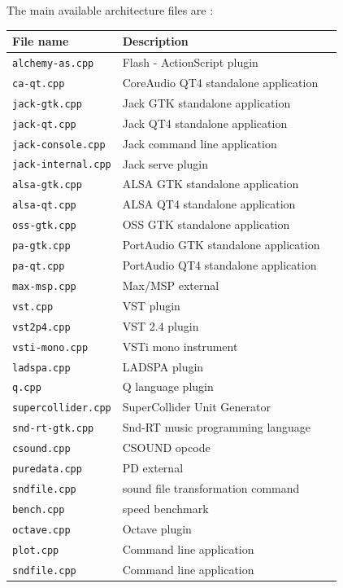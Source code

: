 \documentclass[a4paper,10pt]{book}
\begin{document}
\bigskip

The main available architecture files are :

\bigskip

\begin{tabular}{|l|l|l|}
\hline
\textbf{File name}			& \textbf{Description}   \\
\hline
\texttt{alchemy-as.cpp} 	& Flash - ActionScript plugin \\
\texttt{ca-qt.cpp} 			& CoreAudio QT4 standalone application  \\
\texttt{jack-gtk.cpp} 		& Jack GTK standalone application  \\
\texttt{jack-qt.cpp} 		& Jack QT4 standalone application  \\
\texttt{jack-console.cpp} 	& Jack command line application  \\
\texttt{jack-internal.cpp} 	& Jack serve plugin  \\
\texttt{alsa-gtk.cpp} 		& ALSA GTK standalone application  \\
\texttt{alsa-qt.cpp} 		& ALSA QT4 standalone application  \\
\texttt{oss-gtk.cpp} 		& OSS GTK standalone application  \\
\texttt{pa-gtk.cpp} 		& PortAudio GTK standalone application  \\
\texttt{pa-qt.cpp} 			& PortAudio QT4 standalone application  \\
\hline
\texttt{max-msp.cpp} 		& Max/MSP external  \\
\texttt{vst.cpp} 			& VST plugin  \\
\texttt{vst2p4.cpp} 		& VST 2.4 plugin  \\
\texttt{vsti-mono.cpp} 		& VSTi mono instrument  \\
\texttt{ladspa.cpp} 		& LADSPA plugin  \\
\texttt{q.cpp} 				& Q language plugin  \\
\texttt{supercollider.cpp} 	& SuperCollider Unit Generator  \\
\texttt{snd-rt-gtk.cpp} 	& Snd-RT music programming language  \\
\texttt{csound.cpp} 		& CSOUND opcode  \\
\texttt{puredata.cpp} 		& PD external  \\
\hline
\texttt{sndfile.cpp} 		& sound file transformation command \\
\texttt{bench.cpp} 			& speed benchmark   \\
\texttt{octave.cpp} 		& Octave plugin   \\
\texttt{plot.cpp} 			& Command line application    \\
\texttt{sndfile.cpp} 		& Command line application    \\
\hline
\end{tabular}
\end{document}
